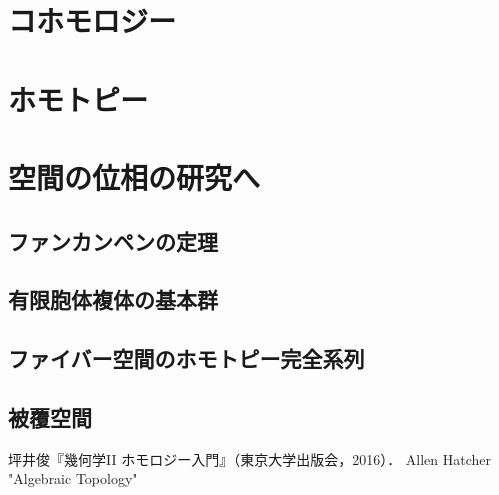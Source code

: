 \documentclass[uplatex,dvipdfmx]{jsreport}
\begin{document}
\chapter{コホモロジー}

\chapter{ホモトピー}

\chapter{空間の位相の研究へ}

\section{ファンカンペンの定理}

\section{有限胞体複体の基本群}

\section{ファイバー空間のホモトピー完全系列}

\section{被覆空間}

\begin{thebibliography}{9}
    坪井俊『幾何学II ホモロジー入門』（東京大学出版会，2016）．
    Allen Hatcher "Algebraic Topology" 
\end{thebibliography}
\end{document}
